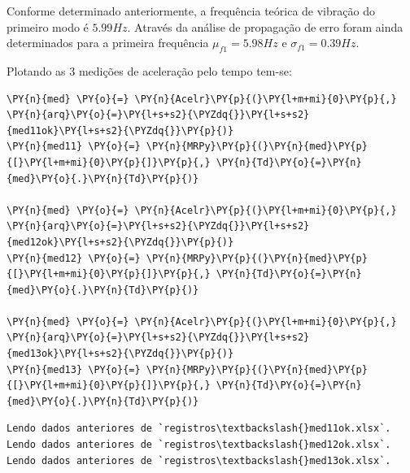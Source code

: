 Conforme determinado anteriormente, a frequência teórica de vibração do
primeiro modo é \(5.99 Hz\). Através da análise de propagação de erro
foram ainda determinados para a primeira frequência \(\mu_{f1}=5.98 Hz\)
e \(\sigma_{f1}=0.39 Hz\).

Plotando as 3 medições de aceleração pelo tempo tem-se:

    \begin{tcolorbox}[breakable, size=fbox, boxrule=1pt, pad at break*=1mm,colback=cellbackground, colframe=cellborder]
\begin{Verbatim}[commandchars=\\\{\}]
\PY{n}{med} \PY{o}{=} \PY{n}{Acelr}\PY{p}{(}\PY{l+m+mi}{0}\PY{p}{,} \PY{n}{arq}\PY{o}{=}\PY{l+s+s2}{\PYZdq{}}\PY{l+s+s2}{med11ok}\PY{l+s+s2}{\PYZdq{}}\PY{p}{)}
\PY{n}{med11} \PY{o}{=} \PY{n}{MRPy}\PY{p}{(}\PY{n}{med}\PY{p}{[}\PY{l+m+mi}{0}\PY{p}{]}\PY{p}{,} \PY{n}{Td}\PY{o}{=}\PY{n}{med}\PY{o}{.}\PY{n}{Td}\PY{p}{)}

\PY{n}{med} \PY{o}{=} \PY{n}{Acelr}\PY{p}{(}\PY{l+m+mi}{0}\PY{p}{,} \PY{n}{arq}\PY{o}{=}\PY{l+s+s2}{\PYZdq{}}\PY{l+s+s2}{med12ok}\PY{l+s+s2}{\PYZdq{}}\PY{p}{)}
\PY{n}{med12} \PY{o}{=} \PY{n}{MRPy}\PY{p}{(}\PY{n}{med}\PY{p}{[}\PY{l+m+mi}{0}\PY{p}{]}\PY{p}{,} \PY{n}{Td}\PY{o}{=}\PY{n}{med}\PY{o}{.}\PY{n}{Td}\PY{p}{)}

\PY{n}{med} \PY{o}{=} \PY{n}{Acelr}\PY{p}{(}\PY{l+m+mi}{0}\PY{p}{,} \PY{n}{arq}\PY{o}{=}\PY{l+s+s2}{\PYZdq{}}\PY{l+s+s2}{med13ok}\PY{l+s+s2}{\PYZdq{}}\PY{p}{)}
\PY{n}{med13} \PY{o}{=} \PY{n}{MRPy}\PY{p}{(}\PY{n}{med}\PY{p}{[}\PY{l+m+mi}{0}\PY{p}{]}\PY{p}{,} \PY{n}{Td}\PY{o}{=}\PY{n}{med}\PY{o}{.}\PY{n}{Td}\PY{p}{)}
\end{Verbatim}
\end{tcolorbox}

    \begin{Verbatim}[commandchars=\\\{\}]
Lendo dados anteriores de `registros\textbackslash{}med11ok.xlsx`.
Lendo dados anteriores de `registros\textbackslash{}med12ok.xlsx`.
Lendo dados anteriores de `registros\textbackslash{}med13ok.xlsx`.
    \end{Verbatim}

